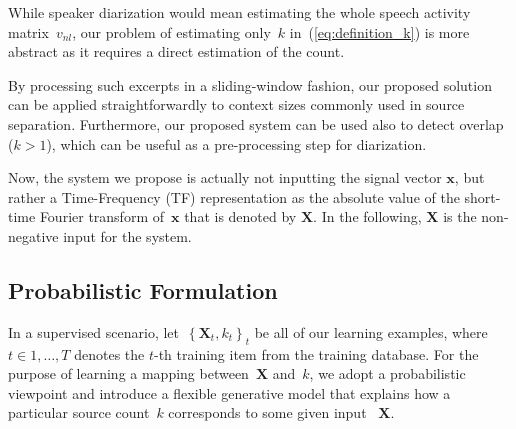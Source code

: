 While speaker diarization would mean estimating the whole speech activity matrix~$v_{nl}$, our problem of estimating only~$k$ in~(\ref{eq:definition_k}) is more abstract as it requires a direct estimation of the count.

By processing such excerpts in a sliding-window fashion, our proposed solution can be applied straightforwardly to context sizes commonly used in source separation.
Furthermore, our proposed system can be used also to detect overlap ($k > 1$), which can be useful as a pre-processing step for diarization.

Now, the system we propose is actually not inputting the signal vector $\mathbf{x}$, but rather a Time-Frequency (TF) representation as the absolute value of the short-time Fourier transform of~$\mathbf{x}$ that is denoted by $\mathbf{X}$.
In the following, $\mathbf{X}$ is the non-negative input for the system.

\subsection{Probabilistic Formulation}%
\label{ssec:model}
In a supervised scenario, let~$ \left\{\mathbf{X}_t,k_t\right\}_t$ be all of our learning examples, where~$t \in{1,\dots,T}$ denotes the $t$-th training item from the training database.
For the purpose of learning a mapping between~$\mathbf{X}$ and~$k$, we adopt a probabilistic viewpoint and introduce a flexible generative model that explains how a particular source count~$k$ corresponds to some given input ~$\mathbf{X}$.

